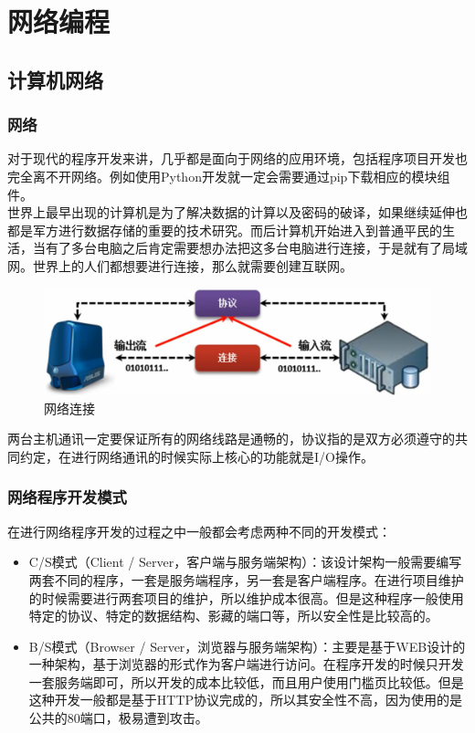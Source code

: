 \chapter{网络编程}

\section{计算机网络}

\subsection{网络}

对于现代的程序开发来讲，几乎都是面向于网络的应用环境，包括程序项目开发也完全离不开网络。例如使用Python开发就一定会需要通过pip下载相应的模块组件。\\

世界上最早出现的计算机是为了解决数据的计算以及密码的破译，如果继续延伸也都是军方进行数据存储的重要的技术研究。而后计算机开始进入到普通平民的生活，当有了多台电脑之后肯定需要想办法把这多台电脑进行连接，于是就有了局域网。世界上的人们都想要进行连接，那么就需要创建互联网。

\begin{figure}[H]
	\centering
	\includegraphics[scale=0.6]{img/C12/12-1/1.png}
	\caption{网络连接}
\end{figure}

两台主机通讯一定要保证所有的网络线路是通畅的，协议指的是双方必须遵守的共同约定，在进行网络通讯的时候实际上核心的功能就是I/O操作。\\

\subsection{网络程序开发模式}

在进行网络程序开发的过程之中一般都会考虑两种不同的开发模式：

\begin{itemize}
	\item C/S模式（Client / Server，客户端与服务端架构）：该设计架构一般需要编写两套不同的程序，一套是服务端程序，另一套是客户端程序。在进行项目维护的时候需要进行两套项目的维护，所以维护成本很高。但是这种程序一般使用特定的协议、特定的数据结构、影藏的端口等，所以安全性是比较高的。

	\item B/S模式（Browser / Server，浏览器与服务端架构）：主要是基于WEB设计的一种架构，基于浏览器的形式作为客户端进行访问。在程序开发的时候只开发一套服务端即可，所以开发的成本比较低，而且用户使用门槛页比较低。但是这种开发一般都是基于HTTP协议完成的，所以其安全性不高，因为使用的是公共的80端口，极易遭到攻击。
\end{itemize}

